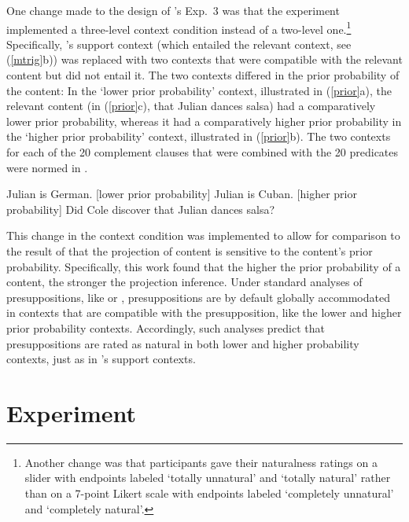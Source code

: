 \documentclass[11pt,fleqn]{article}
\newcommand{\6}{\mbox{$[\hspace*{-.6mm}[$}}
\newcommand{\9}{\mbox{$]\hspace*{-.6mm}]$}}
\newcommand{\citepos}[1]{\citeauthor{#1}'s \citeyear{#1}}
\begin{document}
One change made to the design of \citepos{mandelkern-etal2020} Exp.~3 was that the experiment implemented a three-level context condition instead of a two-level one.\footnote{Another change was that participants gave their naturalness ratings on a slider with endpoints labeled `totally unnatural' and `totally natural' rather than on a 7-point Likert scale with endpoints labeled `completely unnatural' and `completely natural'.}  Specifically, \citepos{mandelkern-etal2020} support context (which entailed the relevant context, see (\ref{mtrig}b)) was replaced with two contexts that were compatible with the relevant content but did not entail it. The two contexts differed in the prior probability of the  content: In the `lower prior probability' context, illustrated in (\ref{prior}a), the  relevant content (in (\ref{prior}c), that Julian dances salsa) had a comparatively lower prior probability, whereas it had a comparatively higher prior probability in the `higher prior probability' context, illustrated in (\ref{prior}b). The two contexts for each of the 20 complement clauses that were combined with the 20 predicates were normed in \citealt{degen-tonhauser-openmind}. 

\begin{exe}
\ex\label{prior}
\begin{xlist}
\ex Julian is German. \hfill [lower prior probability]
\ex Julian is Cuban. \hfill [higher prior probability]
\ex Did Cole discover that Julian dances salsa?
\end{xlist}
\end{exe}
This change in the context condition was implemented to allow for comparison to the result of \citealt{degen-tonhauser-openmind} that the projection of content is sensitive to the content's prior probability. Specifically, this work found that the higher the prior probability of a content, the stronger the projection inference. Under standard analyses of presuppositions, like \citealt{heim83} or \citealt{vds92}, presuppositions are by default globally accommodated in contexts that are compatible with the presupposition, like the lower and higher prior probability contexts. Accordingly, such analyses predict that presuppositions are rated as natural in both lower and higher probability contexts, just as in \citepos{mandelkern-etal2020} support contexts. 

\section{Experiment}\label{s2}
\end{document}
